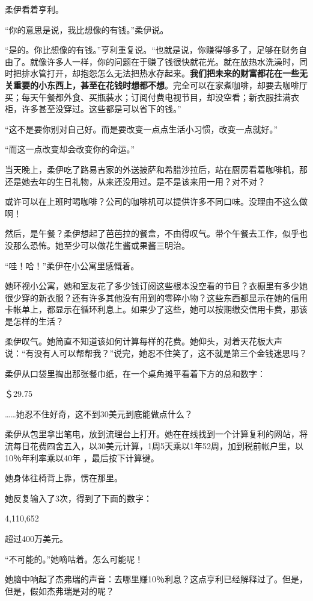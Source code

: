 柔伊看着亨利。

“你的意思是说，我比想像的有钱。”柔伊说。

“是的。你比想像的有钱。”亨利重复说。“也就是说，你赚得够多了，足够在财务自由了。就像许多人一样，你的问题在于赚了钱很快就花光。就在放热水洗澡时，同时把排水管打开，却抱怨怎么无法把热水存起来。\textbf{我们把未来的财富都花在一些无关重要的小东西上，甚至在花钱时想都不想}。完全可以在家煮咖啡，却要去咖啡厅买；每天午餐都外食、买瓶装水；订阅付费电视节目，却没空看；新衣服挂满衣柜，许多甚至没穿过。这些都是可以省下的钱。”

“这不是要你别对自己好。而是要改变一点点生活小习惯，改变一点就好。”

“而这一点改变却会改变你的命运。”

当天晚上，柔伊吃了路易吉家的外送披萨和希腊沙拉后，站在厨房看着咖啡机，那还是她去年的生日礼物，从来还没用过。是不是该来用一用？对不对？

或许可以在上班时喝咖啡？公司的咖啡机可以提供许多不同口味。没理由不这么做啊！

然后，是午餐？柔伊想起了芭芭拉的餐盒，不由得叹气。带个午餐去工作，似乎也没那么恐怖。她至少可以做花生酱或果酱三明治。

“哇！哈！”柔伊在小公寓里感慨着。

她环视小公寓，她和室友花了多少钱订阅这些根本没空看的节目？衣橱里有多少她很少穿的新衣服？还有许多其他没有用到的零碎小物？这些东西都显示在她的信用卡帐单上，都显示在循环利息上。如果少了这些，她可以按期缴交信用卡费，那该是怎样的生活？

柔伊叹气。她简直不知道该如何计算每样的花费。她仰头，对着天花板大声说：“有没有人可以帮帮我？”说完，她忍不住笑了，这不就是第三个金钱迷思吗？

柔伊从口袋里掏出那张餐巾纸，在一个桌角摊平看着下方的总和数字：

＄29.75

……她忍不住好奇，这不到30美元到底能做点什么？

柔伊从包里拿出笔电，放到流理台上打开。她在在线找到一个计算复利的网站，将流每日花费四舍五入，以30美元计算，1周5天乘以1年52周，加到税前帐户里，以10％年利率乘以40年 ，最后按下计算键。

她身体往椅背上靠，愣在那里。

她反复输入了3次，得到了下面的数字：

4,110,652

超过400万美元。

“不可能的。”她嘀咕着。怎么可能呢！

她脑中响起了杰弗瑞的声音：去哪里赚10％利息？这点亨利已经解释过了。但是，但是，假如杰弗瑞是对的呢？

